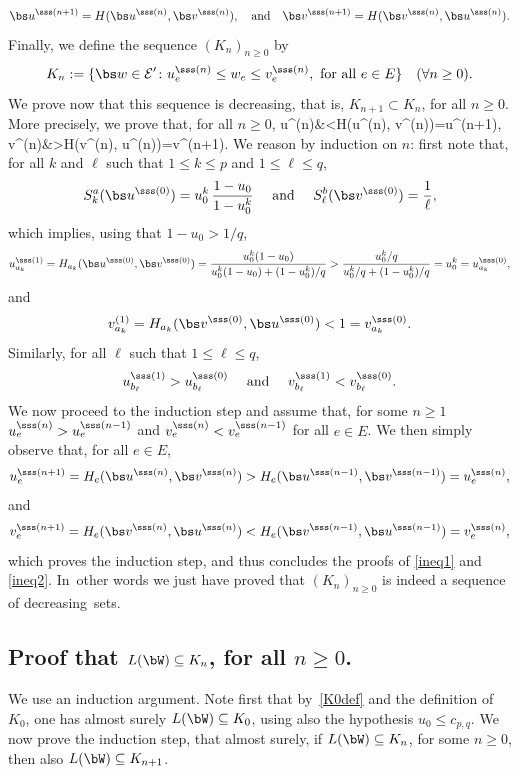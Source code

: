 \[
\bs u^{\sss (n+1)}= H(\bs u^{\sss (n)}, \bs v^{\sss (n)}), \quad \text{and}\quad \bs v^{\sss (n+1)}= H(\bs v^{\sss (n)}, \bs u^{\sss (n)}).
\]
Finally, we define the sequence $(K_n)_{n\ge 0}$ by
\[
K_n:=\{\bs w\in \mathcal E'\colon u^{\sss (n)}_e\le w_e \le v^{\sss (n)}_e, \text{ for all }e\in E\} \quad (\forall n\ge 0).
\]
We prove now that this sequence is decreasing, that is, $K_{n+1}\subset K_n$, for all $n\ge 0$. More precisely, we prove that, for all $n\ge 0$,
\ban
\bs u^{\sss (n)}&<H(\bs u^{\sss (n)}, \bs v^{\sss (n)})=\bs u^{\sss (n+1)}\label{ineq1},\\
\bs v^{\sss (n)}&>H(\bs v^{\sss (n)}, \bs u^{\sss (n)})=\bs v^{\sss (n+1)}.\label{ineq2}
\ean
We reason by induction on $n$: first note that, for all $k$ and $\ell$ such that $1\le k\le p$ and $1\le \ell \le q$,
\[
S^a_k(\bs u^{\sss (0)})=u_0^k\,\frac{1-u_0}{1-u_0^k}\quad\text{ and }\quad S^b_\ell(\bs v^{\sss (0)})=\frac{1}{\ell},
\]
which implies, using that $1-u_0> 1/q$,
\[
u^{\sss (1)}_{a_k}=H_{a_k}(\bs u^{\sss (0)},\bs v^{\sss (0)})=\frac{u_0^k(1-u_0)}{u_0^k(1-u_0)+(1-u_0^k)/q}> \frac{u_0^k/q}{u_0^k/q+(1-u_0^k)/q}=u_0^k=u^{\sss (0)}_{a_k},
\]
and
\[
v^{(1)}_{a_k}=H_{a_k}(\bs v^{\sss (0)},\bs u^{\sss (0)})< 1=v^{\sss (0)}_{a_k}.
\]
Similarly, for all $\ell$ such that $1\le \ell \le q$,
\[
u^{\sss (1)}_{b_\ell}> u^{\sss (0)}_{b_\ell}\quad \text{ and }\quad v^{\sss (1)}_{b_\ell}< v^{\sss (0)}_{b_\ell}.
\]
We now proceed to the induction step and assume that, for some $n\ge1$ $u^{\sss (n)}_{e}> u^{\sss (n-1)}_{e}$ and $v^{\sss (n)}_{e}< v^{\sss (n-1)}_{e}$ for all $e\in E$.
We then simply observe that, for all $e\in E$,
\[
u_e^{\sss (n+1)}=H_e(\bs u^{\sss (n)},\bs v^{\sss (n)})> H_e(\bs u^{\sss (n-1)},\bs v^{\sss (n-1)})=u_e^{\sss (n)},
\]
and
\[
v_e^{\sss (n+1)}=H_e(\bs v^{\sss (n)},\bs u^{\sss (n)})< H_e(\bs v^{\sss (n-1)},\bs u^{\sss (n-1)})=v_e^{\sss (n)},
\]
which proves the induction step, and thus concludes the proofs of \eqref{ineq1} and \eqref{ineq2}. In~other words we just have proved that $(K_n)_{n\ge 0}$ is indeed a sequence of decreasing~sets.

\subsection{Proof that $L(\bW)\subseteq K_n$, for all $n\ge 0$.} \label{subsec.2paths.3}
We use an induction argument. Note first that by~\eqref{K0def} and the definition of $K_0$, one has almost surely $L(\bW) \subseteq K_0$, using also the hypothesis $u_0\le c_{p,q}$.
We now prove the induction step, \ie that almost surely, if $L(\bW) \subseteq K_n$, for some $n\ge 0$, then also
$L(\bW) \subseteq K_{n+1}$.

